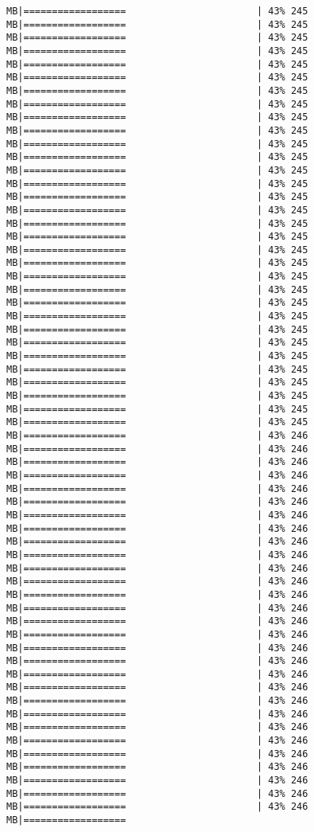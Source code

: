 \documentclass[
]{article}
\begin{document}
\begin{verbatim}
MB|==================                       | 43% 245 MB|==================                       | 43% 245 MB|==================                       | 43% 245 MB|==================                       | 43% 245 MB|==================                       | 43% 245 MB|==================                       | 43% 245 MB|==================                       | 43% 245 MB|==================                       | 43% 245 MB|==================                       | 43% 245 MB|==================                       | 43% 245 MB|==================                       | 43% 245 MB|==================                       | 43% 245 MB|==================                       | 43% 245 MB|==================                       | 43% 245 MB|==================                       | 43% 245 MB|==================                       | 43% 245 MB|==================                       | 43% 245 MB|==================                       | 43% 245 MB|==================                       | 43% 245 MB|==================                       | 43% 245 MB|==================                       | 43% 245 MB|==================                       | 43% 245 MB|==================                       | 43% 245 MB|==================                       | 43% 245 MB|==================                       | 43% 245 MB|==================                       | 43% 245 MB|==================                       | 43% 245 MB|==================                       | 43% 245 MB|==================                       | 43% 245 MB|==================                       | 43% 245 MB|==================                       | 43% 245 MB|==================                       | 43% 245 MB|==================                       | 43% 246 MB|==================                       | 43% 246 MB|==================                       | 43% 246 MB|==================                       | 43% 246 MB|==================                       | 43% 246 MB|==================                       | 43% 246 MB|==================                       | 43% 246 MB|==================                       | 43% 246 MB|==================                       | 43% 246 MB|==================                       | 43% 246 MB|==================                       | 43% 246 MB|==================                       | 43% 246 MB|==================                       | 43% 246 MB|==================                       | 43% 246 MB|==================                       | 43% 246 MB|==================                       | 43% 246 MB|==================                       | 43% 246 MB|==================                       | 43% 246 MB|==================                       | 43% 246 MB|==================                       | 43% 246 MB|==================                       | 43% 246 MB|==================                       | 43% 246 MB|==================                       | 43% 246 MB|==================                       | 43% 246 MB|==================                       | 43% 246 MB|==================                       | 43% 246 MB|==================                       | 43% 246 MB|==================                       | 43% 246 MB|==================                       | 43% 246 MB|==================    
\end{verbatim}
\end{document}
